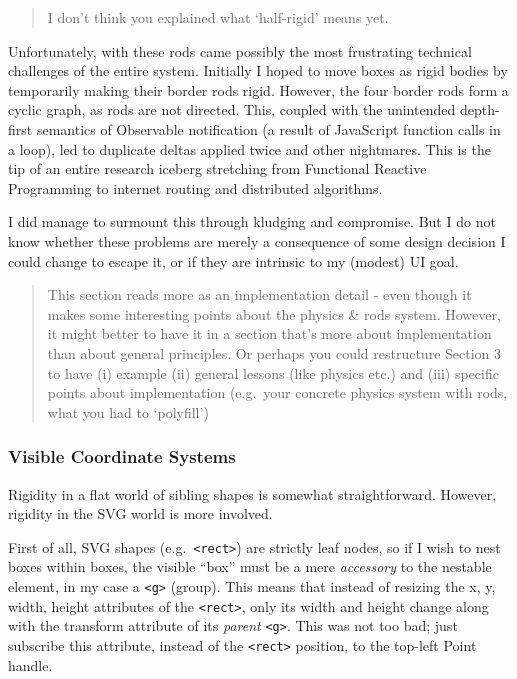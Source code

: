 \documentclass[english,submission]{programming}
\begin{document}
  \begin{quote}
  I don't think you explained what `half-rigid' means yet.
  \end{quote}

  Unfortunately, with these rods came possibly the most frustrating
  technical challenges of the entire system. Initially I hoped to move
  boxes as rigid bodies by temporarily making their border rods rigid.
  However, the four border rods form a cyclic graph, as rods are not
  directed. This, coupled with the unintended depth-first semantics of
  Observable notification (a result of JavaScript function calls in a
  loop), led to duplicate deltas applied twice and other nightmares. This
  is the tip of an entire research iceberg stretching from Functional
  Reactive Programming to internet routing and distributed algorithms.

  I did manage to surmount this through kludging and compromise. But I do
  not know whether these problems are merely a consequence of some design
  decision I could change to escape it, or if they are intrinsic to my
  (modest) UI goal.

  \begin{quote}
  This section reads more as an implementation detail - even though it
  makes some interesting points about the physics \& rods system. However,
  it might better to have it in a section that's more about implementation
  than about general principles. Or perhaps you could restructure Section
  3 to have (i) example (ii) general lessons (like physics etc.) and (iii)
  specific points about implementation (e.g.~your concrete physics system
  with rods, what you had to `polyfill')
  \end{quote}

  \hypertarget{visible-coordinate-systems}{%
  \subsubsection{Visible Coordinate
  Systems}\label{visible-coordinate-systems}}

  Rigidity in a flat world of sibling shapes is somewhat straightforward.
  However, rigidity in the SVG world is more involved.

  First of all, SVG shapes (e.g.~\texttt{\textless{}rect\textgreater{}})
  are strictly leaf nodes, so if I wish to nest boxes within boxes, the
  visible ``box'' must be a mere \emph{accessory} to the nestable element,
  in my case a \texttt{\textless{}g\textgreater{}} (group). This means
  that instead of resizing the x, y, width, height attributes of the
  \texttt{\textless{}rect\textgreater{}}, only its width and height change
  along with the transform attribute of its \emph{parent}
  \texttt{\textless{}g\textgreater{}}. This was not too bad; just
  subscribe this attribute, instead of the
  \texttt{\textless{}rect\textgreater{}} position, to the top-left Point
  handle.
\end{document}

